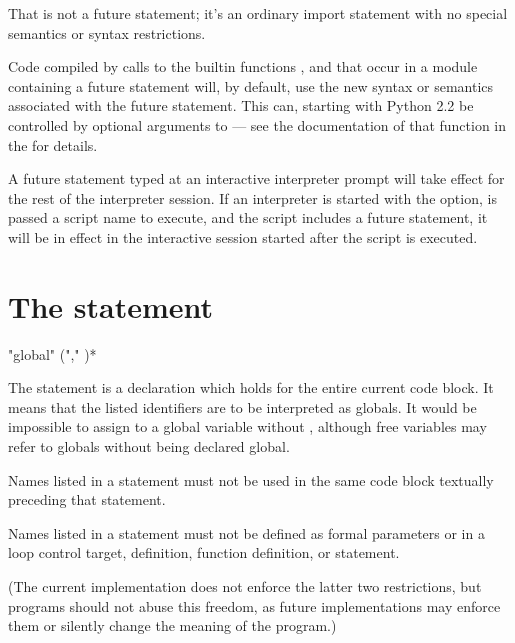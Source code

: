 That is not a future statement; it's an ordinary import statement with
no special semantics or syntax restrictions.

Code compiled by calls to the builtin functions ,
 and  that occur in a module
 containing a future statement will, by default, use the new 
syntax or semantics associated with the future statement.  This can,
starting with Python 2.2 be controlled by optional arguments to
 --- see the documentation of that function in the
 for
details.

A future statement typed at an interactive interpreter prompt will
take effect for the rest of the interpreter session.  If an
interpreter is started with the  option, is passed a
script name to execute, and the script includes a future statement, it
will be in effect in the interactive session started after the script
is executed.

\section{The  statement \label{global}}

\begin{productionlist}
             {"global"  ("," )*}
\end{productionlist}

The  statement is a declaration which holds for the
entire current code block.  It means that the listed identifiers are to be
interpreted as globals.  It would be impossible to assign to a global
variable without , although free variables may refer
to globals without being declared global.

Names listed in a  statement must not be used in the same
code block textually preceding that  statement.

Names listed in a  statement must not be defined as formal
parameters or in a  loop control target, 
definition, function definition, or  statement.

(The current implementation does not enforce the latter two
restrictions, but programs should not abuse this freedom, as future
implementations may enforce them or silently change the meaning of the
program.)

